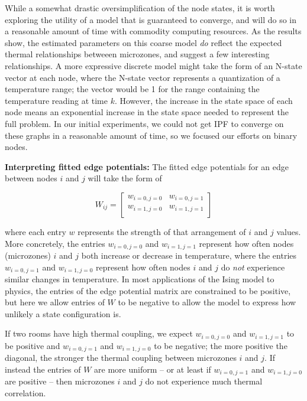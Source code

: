 While a somewhat drastic oversimplification of the node states, it is worth exploring the utility of a model that is guaranteed to converge, and will do so in a reasonable amount of time with commodity computing resources.
As the results show, the estimated parameters on this coarse model \emph{do} reflect the expected thermal relationships betweeen microzones, and suggest a few interesting relationships.
A more expressive discrete model might take the form of an N-state vector at each node, where the N-state vector represents a quantization of a temperature range; the vector would be 1 for the range containing the temperature reading at time $k$.
However, the increase in the state space of each node means an exponential increase in the state space needed to represent the full problem.
In our initial experiments, we could not get IPF to converge on these graphs in a reasonable amount of time, so we focused our efforts on binary nodes.


\textbf{Interpreting fitted edge potentials:} The fitted edge potentials for an edge between nodes $i$ and $j$ will take the form of

\begin{equation}\label{eq:W}
W_{ij} =
\begin{bmatrix}
w_{i=0,j=0} & w_{i=0,j=1} \\
w_{i=1,j=0} & w_{i=1,j=1} \\
\end{bmatrix}
\end{equation}

where each entry $w$ represents the strength of that arrangement of $i$ and $j$ values.
More concretely, the entries $w_{i=0,j=0}$ and $w_{i=1,j=1}$ represent how often nodes (microzones) $i$ and $j$ both increase or decrease in temperature, where the entries $w_{i=0,j=1}$ and $w_{i=1,j=0}$ represent how often nodes $i$ and $j$ do \emph{not} experience similar changes in temperature.
In most applications of the Ising model to physics, the entries of the edge potential matrix are constrained to be positive, but here we allow entries of $W$ to be negative to allow the model to express how unlikely a state configuration is.

If two rooms have high thermal coupling, we expect $w_{i=0,j=0}$ and $w_{i=1,j=1}$ to be positive and $w_{i=0,j=1}$ and $w_{i=1,j=0}$ to be negative; the more positive the diagonal, the stronger the thermal coupling between microzones $i$ and $j$.
If instead the entries of $W$ are more uniform -- or at least if $w_{i=0,j=1}$ and $w_{i=1,j=0}$ are positive -- then microzones $i$ and $j$ do not experience much thermal correlation.

